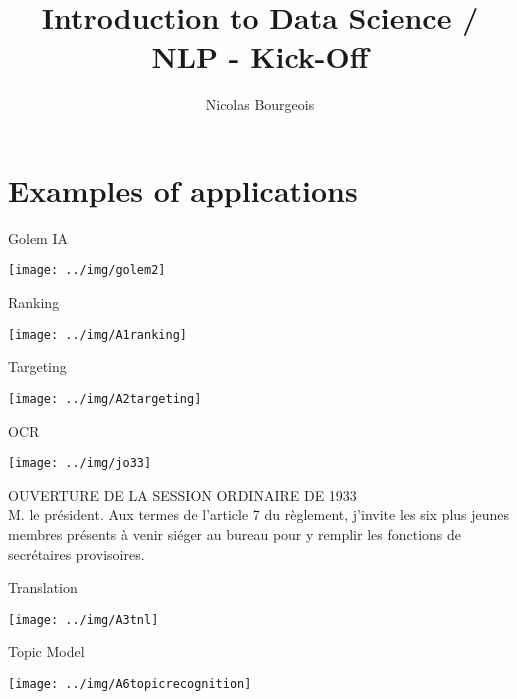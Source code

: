 \documentclass[11pt]{beamer}
\title{Introduction to Data Science / NLP - Kick-Off}
\author{Nicolas Bourgeois}
\date{}
\begin{document}
\begin{frame}
\maketitle
\end{frame}

\section{Examples of applications}

\begin{frame}{Golem IA}

\texttt{[image: ../img/golem2]}
\end{frame}

\begin{frame}{Ranking}

\texttt{[image: ../img/A1ranking]}
\end{frame}

\begin{frame}{Targeting}

\texttt{[image: ../img/A2targeting]}

\end{frame}

\begin{frame}{OCR}

	\texttt{[image: ../img/jo33]}\\
	
	\begin{framed}
OUVERTURE DE LA SESSION ORDINAIRE DE 1933\\
M. le président. Aux termes de l'article 7 du règlement, j'invite les six plus jeunes membres présents à venir siéger au bureau pour y remplir les fonctions de secrétaires provisoires.
	\end{framed}

\end{frame}


\begin{frame}{Translation}

\texttt{[image: ../img/A3tnl]}

\end{frame}

\begin{frame}{Topic Model}

\texttt{[image: ../img/A6topicrecognition]}

\end{frame}
\end{document}
